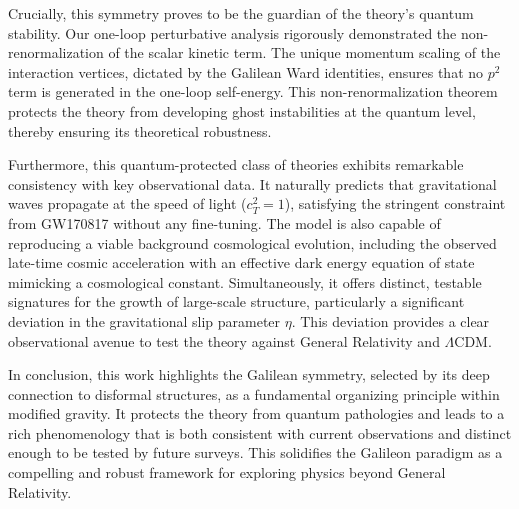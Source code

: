 \documentclass[twocolumn]{aastex631}
\begin{document}
Crucially, this symmetry proves to be the guardian of the theory's quantum stability. Our one-loop perturbative analysis rigorously demonstrated the non-renormalization of the scalar kinetic term. The unique momentum scaling of the interaction vertices, dictated by the Galilean Ward identities, ensures that no $p^2$ term is generated in the one-loop self-energy. This non-renormalization theorem protects the theory from developing ghost instabilities at the quantum level, thereby ensuring its theoretical robustness.

Furthermore, this quantum-protected class of theories exhibits remarkable consistency with key observational data. It naturally predicts that gravitational waves propagate at the speed of light ($c_T^2=1$), satisfying the stringent constraint from GW170817 without any fine-tuning. The model is also capable of reproducing a viable background cosmological evolution, including the observed late-time cosmic acceleration with an effective dark energy equation of state mimicking a cosmological constant. Simultaneously, it offers distinct, testable signatures for the growth of large-scale structure, particularly a significant deviation in the gravitational slip parameter $\eta$. This deviation provides a clear observational avenue to test the theory against General Relativity and $\Lambda$CDM.

In conclusion, this work highlights the Galilean symmetry, selected by its deep connection to disformal structures, as a fundamental organizing principle within modified gravity. It protects the theory from quantum pathologies and leads to a rich phenomenology that is both consistent with current observations and distinct enough to be tested by future surveys. This solidifies the Galileon paradigm as a compelling and robust framework for exploring physics beyond General Relativity.
\end{document}

